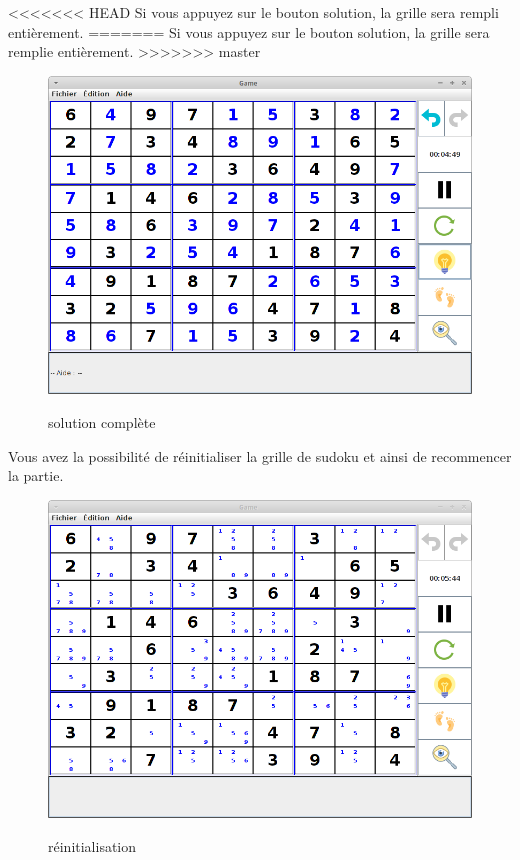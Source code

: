 \newpage
<<<<<<< HEAD
Si vous appuyez sur le bouton solution, la grille sera rempli entièrement.
=======
Si vous appuyez sur le bouton solution, la grille sera remplie entièrement.
>>>>>>> master
\begin{figure}[ht]
  \caption{\label{annexe11} solution complète}
  \includegraphics [width=130mm]{images/solution.png} \\[0.5cm]
\end{figure}

\newpage
Vous avez la possibilité de réinitialiser la grille de sudoku 
et ainsi de recommencer la partie. 
\begin{figure}[ht]
  \caption{\label{annexe12} réinitialisation}
  \includegraphics [width=130mm]{images/reinit.png} \\[0.5cm]
\end{figure}

